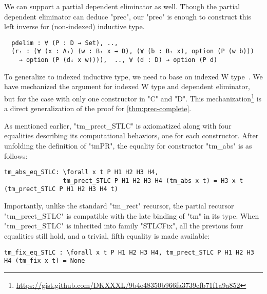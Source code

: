 We can support a partial dependent eliminator as well. Though the partial dependent eliminator can deduce "prec", our "prec" is enough to construct this left inverse for (non-indexed) inductive type. 
\begin{verbatim}
  pdelim : ∀ (P : D → Set), .., 
  (rᵢ : (∀ (x : Aᵢ) (w : Bᵢ x → D), (∀ (b : Bᵢ x), option (P (w b))) 
    → option (P (dᵢ x w)))),  .., ∀ (d : D) → option (P d)
\end{verbatim}
To generalize to indexed inductive type, we need to base on indexed W type~\cite{martin1982constructive, morris2009indexed,jashug2017}. We have mechanized the argument for indexed W type and dependent eliminator, but for the case with only one constructor in "C" and "D". This mechanization\footnote{\url{https://gist.github.com/DKXXXL/9b4e48350b966fa3739cfb71f1a9a852}} is a direct generalization of the proof for \cref{thm:prec-complete}.


As mentioned earlier, "tm_prect_STLC" is axiomatized along with
four equalities describing its computational behaviors, one for each constructor.
After unfolding the definition of "tmPR", the equality for constructor "tm_abs" is as follows:

\begin{centered}
\begin{minipage}{\textwidth}
\begin{lstlisting}[basicstyle=\fontsize{8.25}{9}\ttfamily]
tm_abs_eq_STLC: \forall x t P H1 H2 H3 H4,
                tm_prect_STLC P H1 H2 H3 H4 (tm_abs x t) = H3 x t (tm_prect_STLC P H1 H2 H3 H4 t)
\end{lstlisting}
\end{minipage}
\end{centered}

Importantly, unlike the standard "tm_rect" recursor, the partial recursor
"tm_prect_STLC" is compatible with the late binding of "tm" in its type.
When "tm_prect_STLC" is inherited into family "STLCFix", all the previous four equalities
still hold, and a trivial, fifth equality is made available:

\begin{centered}
\begin{minipage}{.88\textwidth}
\begin{lstlisting}[basicstyle=\fontsize{8.25}{9}\ttfamily]
tm_fix_eq_STLC : \forall x t P H1 H2 H3 H4, tm_prect_STLC P H1 H2 H3 H4 (tm_fix x t) = None
\end{lstlisting}
\end{minipage}
\end{centered}

